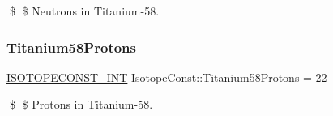 \$ \$ Neutrons in Titanium-\/58. \mbox{\label{group___isotope_const-_titanium-_ti58_ga3fdcfef6771543195fc1fd83c99df89a}} 
\subsubsection{\texorpdfstring{Titanium58\+Protons}{Titanium58Protons}}
{\footnotesize\ttfamily \mbox{\hyperlink{group___isotope_const-_macros_ga5f18360b3e99483a35c32d789e62621c}{I\+S\+O\+T\+O\+P\+E\+C\+O\+N\+S\+T\+\_\+\+I\+NT}} Isotope\+Const\+::\+Titanium58\+Protons = 22}

\$ \$ Protons in Titanium-\/58. 